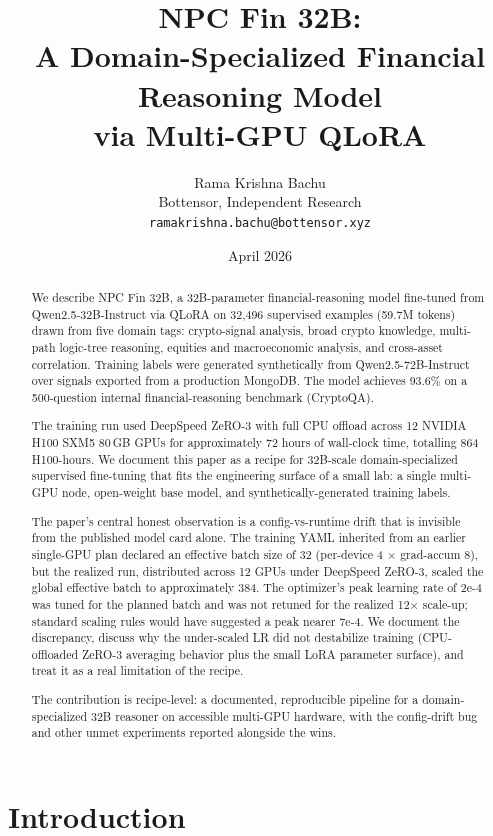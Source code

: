 \documentclass[10pt,letterpaper]{article}
\title{\bfseries NPC Fin 32B:\\
A Domain-Specialized Financial Reasoning Model\\
via Multi-GPU QLoRA}
\author{Rama Krishna Bachu\\
\small Bottensor, Independent Research\\
\small \texttt{ramakrishna.bachu@bottensor.xyz}}
\date{April 2026}
\begin{document}
\maketitle

\begin{abstract}
\noindent
We describe NPC Fin 32B, a 32B-parameter financial-reasoning model fine-tuned from Qwen2.5-32B-Instruct via QLoRA on 32{,}496 supervised examples (59.7M tokens) drawn from five domain tags: crypto-signal analysis, broad crypto knowledge, multi-path logic-tree reasoning, equities and macroeconomic analysis, and cross-asset correlation. Training labels were generated synthetically from Qwen2.5-72B-Instruct over signals exported from a production MongoDB. The model achieves 93.6\% on a 500-question internal financial-reasoning benchmark (CryptoQA).

The training run used DeepSpeed ZeRO-3 with full CPU offload across 12 NVIDIA H100 SXM5 80\,GB GPUs for approximately 72 hours of wall-clock time, totalling 864 H100-hours. We document this paper as a recipe for 32B-scale domain-specialized supervised fine-tuning that fits the engineering surface of a small lab: a single multi-GPU node, open-weight base model, and synthetically-generated training labels.

The paper's central honest observation is a config-vs-runtime drift that is invisible from the published model card alone. The training YAML inherited from an earlier single-GPU plan declared an effective batch size of 32 (per-device 4 $\times$ grad-accum 8), but the realized run, distributed across 12 GPUs under DeepSpeed ZeRO-3, scaled the global effective batch to approximately 384. The optimizer's peak learning rate of 2e-4 was tuned for the planned batch and was not retuned for the realized 12$\times$ scale-up; standard scaling rules would have suggested a peak nearer 7e-4. We document the discrepancy, discuss why the under-scaled LR did not destabilize training (CPU-offloaded ZeRO-3 averaging behavior plus the small LoRA parameter surface), and treat it as a real limitation of the recipe.

The contribution is recipe-level: a documented, reproducible pipeline for a domain-specialized 32B reasoner on accessible multi-GPU hardware, with the config-drift bug and other unmet experiments reported alongside the wins.
\end{abstract}

\section{Introduction}
\end{document}

